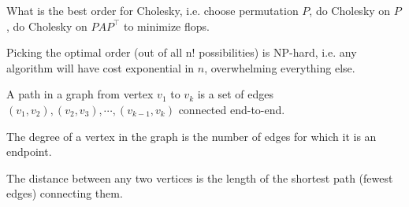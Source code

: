 \documentclass[11pt]{article}
\numberwithin{equation}{section}
\begin{document}
What is the best order for Cholesky, i.e. choose permutation $P$, do Cholesky on $P$, do Cholesky on $PAP^\top$ to minimize flops.

\begin{theorem}
    Picking the optimal order (out of all n! possibilities) is NP-hard, i.e. any algorithm will have cost exponential in $n$, overwhelming everything else.
\end{theorem}

\begin{definition}
    A path in a graph from vertex $v_1$ to $v_k$ is a set of edges $(v_1,v_2),(v_2,v_3), \cdots , (v_{k-1},v_k)$ connected end-to-end.
\end{definition}

\begin{definition}
    The degree of a vertex in the graph is the number of edges for which it is an endpoint.
\end{definition}

\begin{definition}
    The distance between any two vertices is the length of the shortest path (fewest edges) connecting them.
\end{definition}
\end{document}
